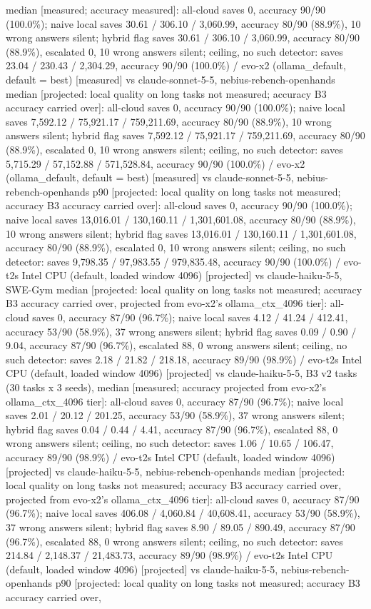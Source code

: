 median [measured; accuracy measured]: all-cloud saves 0, accuracy 90/90 (100.0\%); naive local saves 30.61 / 306.10 / 3,060.99, accuracy 80/90 (88.9\%), 10 wrong answers silent; hybrid flag saves 30.61 / 306.10 / 3,060.99, accuracy 80/90 (88.9\%), escalated 0, 10 wrong answers silent; ceiling, no such detector: saves 23.04 / 230.43 / 2,304.29, accuracy 90/90 (100.0\%) / evo-x2 (ollama\_default, default = best) [measured] vs claude-sonnet-5-5, nebius-rebench-openhands median [projected: local quality on long tasks not measured; accuracy B3 accuracy carried over]: all-cloud saves 0, accuracy 90/90 (100.0\%); naive local saves 7,592.12 / 75,921.17 / 759,211.69, accuracy 80/90 (88.9\%), 10 wrong answers silent; hybrid flag saves 7,592.12 / 75,921.17 / 759,211.69, accuracy 80/90 (88.9\%), escalated 0, 10 wrong answers silent; ceiling, no such detector: saves 5,715.29 / 57,152.88 / 571,528.84, accuracy 90/90 (100.0\%) / evo-x2 (ollama\_default, default = best) [measured] vs claude-sonnet-5-5, nebius-rebench-openhands p90 [projected: local quality on long tasks not measured; accuracy B3 accuracy carried over]: all-cloud saves 0, accuracy 90/90 (100.0\%); naive local saves 13,016.01 / 130,160.11 / 1,301,601.08, accuracy 80/90 (88.9\%), 10 wrong answers silent; hybrid flag saves 13,016.01 / 130,160.11 / 1,301,601.08, accuracy 80/90 (88.9\%), escalated 0, 10 wrong answers silent; ceiling, no such detector: saves 9,798.35 / 97,983.55 / 979,835.48, accuracy 90/90 (100.0\%) / evo-t2s Intel CPU (default, loaded window 4096) [projected] vs claude-haiku-5-5, SWE-Gym median [projected: local quality on long tasks not measured; accuracy B3 accuracy carried over, projected from evo-x2's ollama\_ctx\_4096 tier]: all-cloud saves 0, accuracy 87/90 (96.7\%); naive local saves 4.12 / 41.24 / 412.41, accuracy 53/90 (58.9\%), 37 wrong answers silent; hybrid flag saves 0.09 / 0.90 / 9.04, accuracy 87/90 (96.7\%), escalated 88, 0 wrong answers silent; ceiling, no such detector: saves 2.18 / 21.82 / 218.18, accuracy 89/90 (98.9\%) / evo-t2s Intel CPU (default, loaded window 4096) [projected] vs claude-haiku-5-5, B3 v2 tasks (30 tasks x 3 seeds), median [measured; accuracy projected from evo-x2's ollama\_ctx\_4096 tier]: all-cloud saves 0, accuracy 87/90 (96.7\%); naive local saves 2.01 / 20.12 / 201.25, accuracy 53/90 (58.9\%), 37 wrong answers silent; hybrid flag saves 0.04 / 0.44 / 4.41, accuracy 87/90 (96.7\%), escalated 88, 0 wrong answers silent; ceiling, no such detector: saves 1.06 / 10.65 / 106.47, accuracy 89/90 (98.9\%) / evo-t2s Intel CPU (default, loaded window 4096) [projected] vs claude-haiku-5-5, nebius-rebench-openhands median [projected: local quality on long tasks not measured; accuracy B3 accuracy carried over, projected from evo-x2's ollama\_ctx\_4096 tier]: all-cloud saves 0, accuracy 87/90 (96.7\%); naive local saves 406.08 / 4,060.84 / 40,608.41, accuracy 53/90 (58.9\%), 37 wrong answers silent; hybrid flag saves 8.90 / 89.05 / 890.49, accuracy 87/90 (96.7\%), escalated 88, 0 wrong answers silent; ceiling, no such detector: saves 214.84 / 2,148.37 / 21,483.73, accuracy 89/90 (98.9\%) / evo-t2s Intel CPU (default, loaded window 4096) [projected] vs claude-haiku-5-5, nebius-rebench-openhands p90 [projected: local quality on long tasks not measured; accuracy B3 accuracy carried over, 